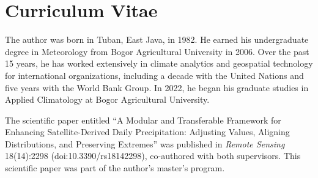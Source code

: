 %
\chapter*{Curriculum Vitae}\thispagestyle{fancy}

The author was born in Tuban, East Java, in 1982. He earned his undergraduate degree 
in Meteorology from Bogor Agricultural University in 2006. Over the past 15 years, he 
has worked extensively in climate analytics and geospatial technology for international 
organizations, including a decade with the United Nations and five years with the World Bank Group. 
In 2022, he began his graduate studies in Applied Climatology at Bogor Agricultural University.

The scientific paper entitled ``A Modular and Transferable
Framework for Enhancing Satellite-Derived Daily Precipitation: Adjusting Values, Aligning
Distributions, and Preserving Extremes'' was published in \emph{Remote Sensing}
18(14):2298 (doi:10.3390/rs18142298), co-authored with both supervisors. This scientific
paper was part of the author's master's program.